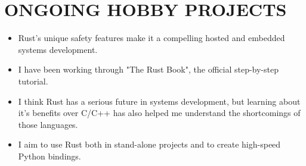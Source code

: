 \section{ONGOING HOBBY PROJECTS}

{
  {\begin{itemize}
    \item Rust's unique safety features make it a compelling hosted and embedded systems development.
    \item I have been working through "The Rust Book", the official step-by-step tutorial.
    \item I think Rust has a serious future in systems development, but learning about it's benefits over C/C++ has also helped me understand the shortcomings of those languages.
    \item I aim to use Rust both in stand-alone projects and to create high-speed Python bindings. 
  \end{itemize}
  }
}

